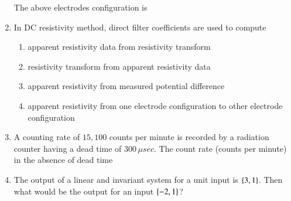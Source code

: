 \documentclass[journal,12pt,onecolumn]{IEEEtran}
\theoremstyle{remark}
\begin{document}
\begin{enumerate}[start = 21]
    The above electrodes configuration is 
    \begin{enumerate}
    \end{enumerate}
     \item In DC resistivity method, direct filter coefficients are used to compute \hfill{} 
            \begin{enumerate}
                \item apparent resistivity data from resistivity transform
                \item resistivity transform from apparent resistivity data
                \item apparent resistivity from measured potential difference
                \item apparent resistivity from one electrode configuration to other electrode configuration                
            \end{enumerate}
    \item A counting rate of $15,100$ counts per minute is recorded by a radiation counter having a dead time of $300\,\mu sec$. The count rate (counts per minute) in the absence of dead time \hfill{} 
            \begin {enumerate}
            \end{enumerate}
     \item The output of a linear and invariant system for a unit input is $\left\{3,1\right\}$. Then what would be the output for an input $\left\{-2,1\right\}$? \hfill{} 
            \begin {enumerate}
                \begin{multicols}{4}

\end{multicols}
\end{enumerate}
\end{enumerate}
\end{document}
